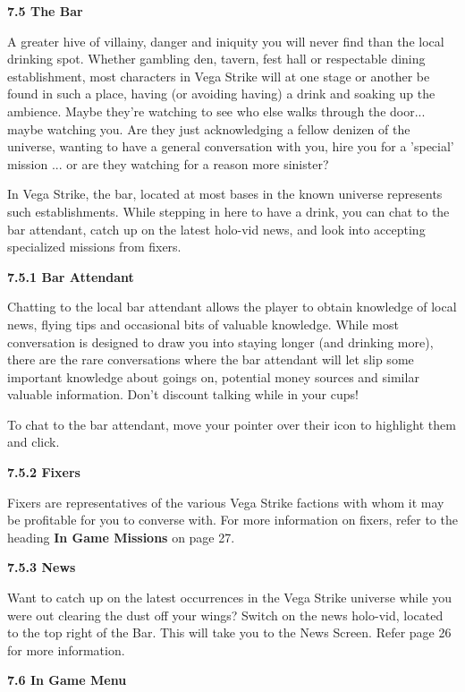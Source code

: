 \documentclass{article}
\begin{document}
\textbf{7.5 The Bar }



A greater hive of villainy, danger and iniquity you will never find than the local drinking spot. Whether gambling den, tavern, fest hall or respectable dining establishment, most characters in Vega Strike will at one stage or another be found in such a place, having (or avoiding having) a drink and soaking up the ambience. Maybe they're watching to see who else walks through the door... maybe watching you. Are they just acknowledging a fellow denizen of the universe, wanting to have a general conversation with you, hire you for a 'special' mission ... or are they watching for a reason more sinister? 



In Vega Strike, the bar, located at most bases in the known universe represents such establishments. While stepping in here to have a drink, you can chat to the bar attendant, catch up on the latest holo-vid news, and look into accepting specialized missions from fixers. 

\textbf{7.5.1 Bar Attendant }

Chatting to the local bar attendant allows the player to obtain knowledge of local news, flying tips and occasional bits of valuable knowledge. While most conversation is designed to draw you into staying longer (and drinking more), there are the rare conversations where the bar attendant will let slip some important knowledge about goings on, potential money sources and similar valuable information. Don't discount talking while in your cups! 

To chat to the bar attendant, move your pointer over their icon to highlight them and click. 

\textbf{7.5.2 Fixers }

Fixers are representatives of the various Vega Strike factions with whom it may be profitable for you to converse with. For more information on fixers, refer to the heading \textbf{In Game Missions} on page 27. 

\textbf{7.5.3 News }

Want to catch up on the latest occurrences in the Vega Strike universe while you were out clearing the dust off your wings? Switch on the news holo-vid, located to the top right of the Bar. This will take you to the News Screen. Refer page 26 for more information. 

\textbf{}

\textbf{}

\textbf{7.6 In Game Menu }
\end{document}

